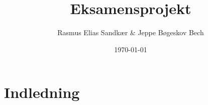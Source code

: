 \documentclass[11pt]{article}
\author{Rasmus Elias Sandkær \& Jeppe Bøgeskov Bech}
\date{\today}
\title{Eksamensprojekt}
\begin{document}


\restoregeometry
\tableofcontents
\newpage

\section{Indledning}
\end{document}
